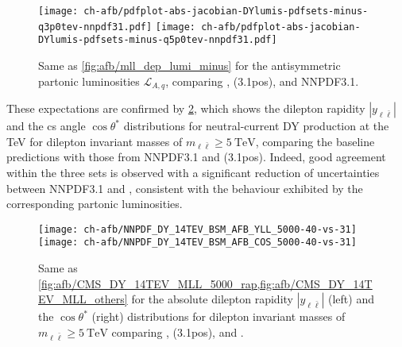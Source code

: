 \begin{figure}[!t]
 \centering
 \texttt{[image: ch-afb/pdfplot-abs-jacobian-DYlumis-pdfsets-minus-q3p0tev-nnpdf31.pdf]}
 \texttt{[image: ch-afb/pdfplot-abs-jacobian-DYlumis-pdfsets-minus-q5p0tev-nnpdf31.pdf]}
 \caption{Same as \cref{fig:afb/mll_dep_lumi_minus} for the antisymmetric partonic luminosities $\mathcal{L}_{A,q}$,
   comparing , (3.1pos), and NNPDF3.1.
 }    
 \label{fig:afb/pdfplot-absDYlumis-pdfsets-minus-q5tev-nnpdf31}
\end{figure}

These expectations are confirmed by
\cref{fig:afb/CMS_DY_14TEV_COSTH_5000_YLL40-vs-31}, which shows the
dilepton rapidity $|y_{\ell\bar{\ell}}|$ 
and the \acrlong{cs} angle $\cos\theta^*$ distributions for neutral-current DY production
at the  TeV for dilepton invariant masses of $m_{\ell\bar{\ell}}\ge \SI{5}{\tera\electronvolt}$,
comparing the baseline  predictions with those from NNPDF3.1
and (3.1pos).
%
Indeed, 
good agreement within the three \pdf sets is observed with a significant reduction
of \pdf uncertainties between NNPDF3.1 and , consistent
with the behaviour exhibited by the corresponding partonic luminosities.

\begin{figure}[!t]
 \centering
 \texttt{[image: ch-afb/NNPDF\_DY\_14TEV\_BSM\_AFB\_YLL\_5000-40-vs-31]}
 \texttt{[image: ch-afb/NNPDF\_DY\_14TEV\_BSM\_AFB\_COS\_5000-40-vs-31]}
 \caption{
   Same as
   \cref{fig:afb/CMS_DY_14TEV_MLL_5000_rap,fig:afb/CMS_DY_14TEV_MLL_others} for
   the absolute dilepton rapidity $|y_{\ell\bar{\ell}}|$ (left) and the $\cos
   \theta^*$ (right) distributions for dilepton invariant masses of
   $m_{\ell\bar{\ell}}\ge \SI{5}{\tera\electronvolt}$ comparing ,
   (3.1pos), and .
 }    
 \label{fig:afb/CMS_DY_14TEV_COSTH_5000_YLL40-vs-31}
\end{figure}
